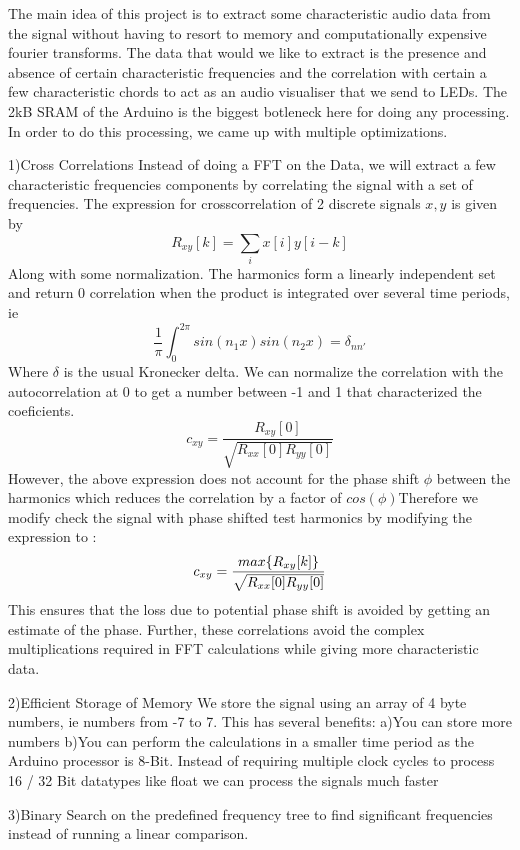 
The main idea of this project is to extract some characteristic audio data from the signal without having to resort to memory and computationally expensive fourier transforms. The data that would we like to extract is the presence and absence of certain characteristic frequencies and the correlation with certain a few characteristic chords to act as an audio visualiser that we send to LEDs. The 2kB SRAM of the Arduino is the biggest botleneck here for doing any processing. In order to do this processing, we came up with multiple optimizations. 

1)Cross Correlations 
Instead of doing a FFT on the Data, we will extract a few characteristic frequencies components by correlating the signal with a set of frequencies. The expression for crosscorrelation of 2 discrete signals \(x,y\) is given by 
\begin{equation}
    R_{xy}[k] = \sum_{i} x[i]y[i-k]
\end{equation}
Along with some normalization. The harmonics form a linearly independent set and return 0 correlation when the product is integrated over several time periods, ie 
\begin{equation}
    \frac{1}{\pi} \int_0^{2\pi}sin(n_1x)sin(n_2x) = \delta_{nn'}  
\end{equation} 
Where \(\delta\) is the usual Kronecker delta. We can normalize the correlation with the autocorrelation at 0 to get a number between -1 and 1 that characterized the coeficients.
\begin{equation}
    c_{xy} = \frac{R_{xy}[0]}{\sqrt{R_{xx}[0]R_{yy}[0]} }
\end{equation} 
However, the above expression does not account for the phase shift \(\phi\) between the harmonics which reduces the correlation by a factor of \(cos(\phi)\)Therefore we modify check the signal with phase shifted test harmonics by modifying the expression to :
\begin{equation}
    c_{xy} = \frac{\mathnormal{max}\{R_{xy}[k]\}}{\sqrt{R_{xx}[0]R_{yy}[0]} }
\end{equation}
This ensures that the loss due to potential phase shift is avoided by getting an estimate of the phase. 
Further, these correlations avoid the complex multiplications required in FFT calculations while giving more characteristic data. 

2)Efficient Storage of Memory
We store the signal using an array of 4 byte numbers, ie numbers from -7 to 7. This has several benefits: 
a)You can store more numbers 
b)You can perform the calculations in a smaller time period as the Arduino processor is 8-Bit. Instead of requiring multiple clock cycles to process 16 / 32 Bit datatypes like float we can process the signals much faster 

3)Binary Search on the predefined frequency tree to find significant frequencies instead of running a linear comparison. 